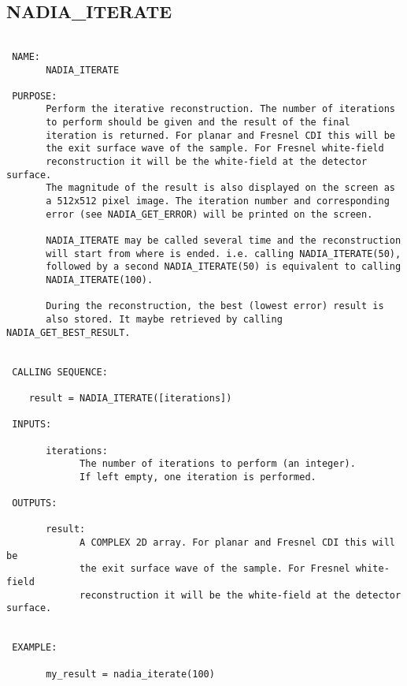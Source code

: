 





  
 
\subsection{NADIA\_ITERATE}
\begin{verbatim}

 NAME:
       NADIA_ITERATE

 PURPOSE:
       Perform the iterative reconstruction. The number of iterations
       to perform should be given and the result of the final
       iteration is returned. For planar and Fresnel CDI this will be
       the exit surface wave of the sample. For Fresnel white-field
       reconstruction it will be the white-field at the detector surface.
       The magnitude of the result is also displayed on the screen as
       a 512x512 pixel image. The iteration number and corresponding
       error (see NADIA_GET_ERROR) will be printed on the screen.

       NADIA_ITERATE may be called several time and the reconstruction
       will start from where is ended. i.e. calling NADIA_ITERATE(50),
       followed by a second NADIA_ITERATE(50) is equivalent to calling
       NADIA_ITERATE(100).

       During the reconstruction, the best (lowest error) result is
       also stored. It maybe retrieved by calling NADIA_GET_BEST_RESULT.
 

 CALLING SEQUENCE:

	result = NADIA_ITERATE([iterations])

 INPUTS:

       iterations: 
             The number of iterations to perform (an integer). 
             If left empty, one iteration is performed.

 OUTPUTS:

       result:
             A COMPLEX 2D array. For planar and Fresnel CDI this will be
             the exit surface wave of the sample. For Fresnel white-field
             reconstruction it will be the white-field at the detector surface.


 EXAMPLE:

       my_result = nadia_iterate(100)

\end{verbatim}






